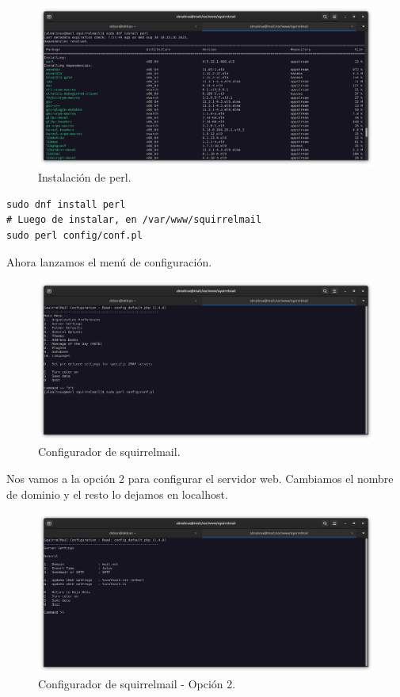 \begin{figure}[H]
	\centering
	\includegraphics[scale=0.30]{23}
	\caption{Instalación de perl.}
\end{figure}

\begin{lstlisting}[style=mybash]
sudo dnf install perl
# Luego de instalar, en /var/www/squirrelmail
sudo perl config/conf.pl
\end{lstlisting}

Ahora lanzamos el menú de configuración.

\begin{figure}[H]
	\centering
	\includegraphics[scale=0.30]{24}
	\caption{Configurador de squirrelmail.}
\end{figure}

Nos vamos a la opción 2 para configurar el servidor web. Cambiamos el nombre de dominio y el resto lo dejamos en localhost.

\begin{figure}[H]
	\centering
	\includegraphics[scale=0.30]{25}
	\caption{Configurador de squirrelmail - Opción 2.}
\end{figure}

